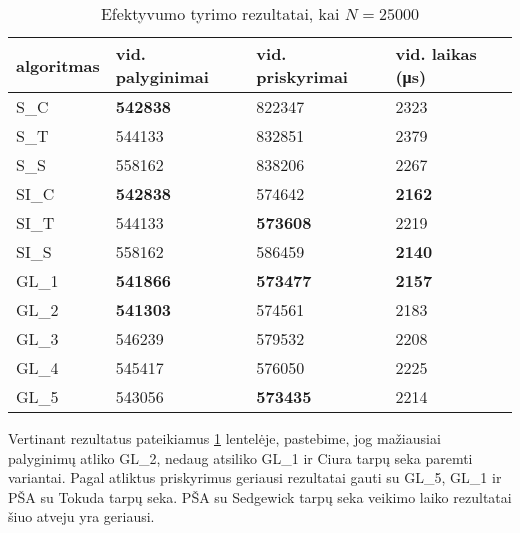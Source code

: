 \documentclass{VUMIFInfKursinis}
\begin{document}
\begin{table}[H]
  \caption{Efektyvumo tyrimo rezultatai, kai $N = 25000$}
  \label{results_25000}
  \centering
  \begin{tabular}{llll}
    algoritmas & vid. palyginimai                        & vid. priskyrimai                        & vid. laikas (μs)                      \\ \midrule
    S\_C       & \cellcolor[HTML]{70AD47}\textbf{542838} & 822347                                  & 2323                                  \\
    S\_T       & 544133                                  & 832851                                  & 2379                                  \\
    S\_S       & 558162                                  & 838206                                  & 2267                                  \\
    SI\_C & \cellcolor[HTML]{70AD47}\textbf{542838} & 574642                                  & \cellcolor[HTML]{70AD47}\textbf{2162} \\
    SI\_T      & 544133                                  & \cellcolor[HTML]{70AD47}\textbf{573608} & 2219                                  \\
    SI\_S      & 558162                                  & 586459                                  & \cellcolor[HTML]{70AD47}\textbf{2140} \\
    GL\_1 & \cellcolor[HTML]{70AD47}\textbf{541866} & \cellcolor[HTML]{70AD47}\textbf{573477} & \cellcolor[HTML]{70AD47}\textbf{2157} \\
    GL\_2      & \cellcolor[HTML]{70AD47}\textbf{541303} & 574561                                  & 2183                                  \\
    GL\_3      & 546239                                  & 579532                                  & 2208                                  \\
    GL\_4      & 545417                                  & 576050                                  & 2225                                  \\ 
    GL\_5      & 543056                                  & \cellcolor[HTML]{70AD47}\textbf{573435} & 2214                                  \\ \bottomrule 
  \end{tabular}
\end{table}

Vertinant rezultatus pateikiamus \ref{results_25000} lentelėje, pastebime, jog
mažiausiai palyginimų atliko GL\_2, nedaug atsiliko GL\_1 ir Ciura tarpų seka paremti variantai.
Pagal atliktus priskyrimus geriausi rezultatai gauti su GL\_5, GL\_1 ir PŠA su Tokuda tarpų seka.
PŠA su Sedgewick tarpų seka veikimo laiko rezultatai šiuo atveju yra geriausi.
\end{document}
